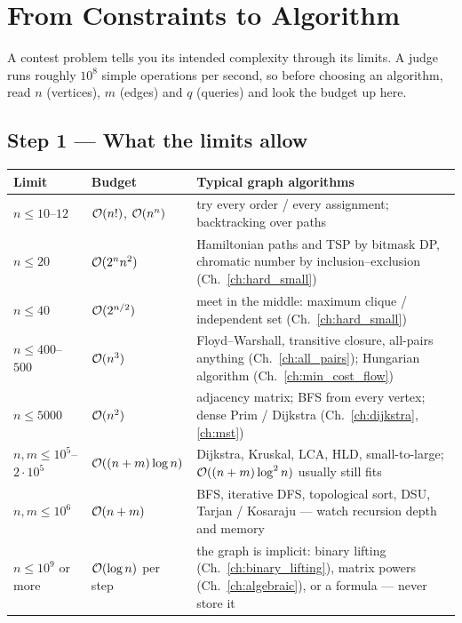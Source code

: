 \chapter{From Constraints to Algorithm}
\label{ch:constraints}

A contest problem tells you its intended complexity through its limits. A judge runs roughly $10^8$ simple operations per second, so before choosing an algorithm, read $n$ (vertices), $m$ (edges) and $q$ (queries) and look the budget up here.

\section*{Step 1 --- What the limits allow}

\begingroup\small\renewcommand{\arraystretch}{1.3}
\begin{tabularx}{\linewidth}{@{}l l X@{}}
\toprule
\textbf{Limit} & \textbf{Budget} & \textbf{Typical graph algorithms} \\
\midrule
$n \le 10$--$12$ & $\mathcal{O}(n!)$, $\mathcal{O}(n^n)$ & try every order / every assignment; backtracking over paths \\
$n \le 20$ & $\mathcal{O}(2^n n^2)$ & Hamiltonian paths and TSP by bitmask DP, chromatic number by inclusion--exclusion (Ch.~\ref{ch:hard_small}) \\
$n \le 40$ & $\mathcal{O}(2^{n/2})$ & meet in the middle: maximum clique / independent set (Ch.~\ref{ch:hard_small}) \\
$n \le 400$--$500$ & $\mathcal{O}(n^3)$ & Floyd--Warshall, transitive closure, all-pairs anything (Ch.~\ref{ch:all_pairs}); Hungarian algorithm (Ch.~\ref{ch:min_cost_flow}) \\
$n \le 5000$ & $\mathcal{O}(n^2)$ & adjacency matrix; BFS from every vertex; dense Prim / Dijkstra (Ch.~\ref{ch:dijkstra}, \ref{ch:mst}) \\
$n, m \le 10^5$--$2\cdot10^5$ & $\mathcal{O}((n+m)\log n)$ & Dijkstra, Kruskal, LCA, HLD, small-to-large; $\mathcal{O}((n+m)\log^2 n)$ usually still fits \\
$n, m \le 10^6$ & $\mathcal{O}(n+m)$ & BFS, iterative DFS, topological sort, DSU, Tarjan / Kosaraju --- watch recursion depth and memory \\
$n \le 10^{9}$ or more & $\mathcal{O}(\log n)$ per step & the graph is implicit: binary lifting (Ch.~\ref{ch:binary_lifting}), matrix powers (Ch.~\ref{ch:algebraic}), or a formula --- never store it \\
\bottomrule
\end{tabularx}
\endgroup

